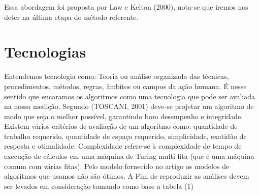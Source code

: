 \documentclass[letterpaper, 10 pt, conference]{ieeeconf}
\begin{document}
Essa abordagem foi proposta por Law e Kelton (2000), nota-se que iremos nos deter na última etapa do método referente. 
\section{Tecnologias}

Entendemos tecnologia como: Teoria ou análise organizada das técnicas, procedimentos, métodos, regras, âmbitos ou campos da ação humana. É nesse sentido que encaramos os  algoritmos como uma tecnologia que pode ser avaliada na nossa medição.
Segundo (TOSCANI, 2001) deve-se projetar um algoritmo de modo que  seja o melhor possível, garantindo bom desempenho e integridade. Existem vários critérios de avaliação de um 
algoritmo como: quantidade de trabalho requerido, quantidade de espaço requerido, simplicidade, exatidão de resposta e otimalidade. Complexidade refere-se à complexidade de tempo
de execução de cálculos em uma máquina de Turing multi fita (que é uma  máquina comum com várias fitas).  Pelo modelo fornecido no artigo os modelos de algoritmos que usamos não 
são ótimos. A Fim de reproduzir as análises devem ser levados em consideração tomando como base a tabela (1)
\end{document}

